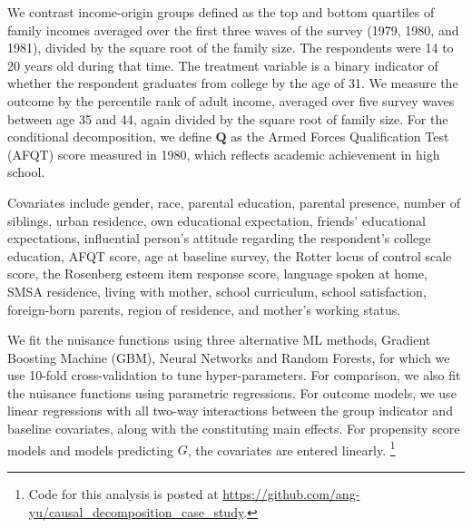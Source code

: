 \documentclass[12pt,a4paper]{article}
\def\Q{{\boldsymbol Q}}
\begin{document}
We contrast income-origin groups defined as the top and bottom quartiles of family incomes averaged over the first three waves of the survey (1979, 1980, and 1981), divided by the square root of the family size. The respondents were 14 to 20 years old during that time. The treatment variable is a binary indicator of whether the respondent graduates from college by the age of 31. We measure the outcome by the percentile rank of adult income, averaged over five survey waves between age 35 and 44, again divided by the square root of family size. For the conditional decomposition, we define $\Q$ as the Armed Forces Qualification Test (AFQT) score measured in 1980, which reflects academic achievement in high school. 

Covariates include gender, race, parental education, parental presence, number of siblings, urban residence, own educational expectation, friends' educational expectations, influential person's attitude regarding the respondent's college education, AFQT score, age at baseline survey, the Rotter locus of control scale score, the Rosenberg esteem item response score, language spoken at home, SMSA residence, living with mother, school curriculum, school satisfaction, foreign-born parents, region of residence, and mother's working status. 

We fit the nuisance functions using three alternative ML methods, Gradient Boosting Machine (GBM), Neural Networks and Random Forests, for which we use 10-fold cross-validation to tune hyper-parameters. For comparison, we also fit the nuisance functions using parametric regressions. For outcome models, we use linear regressions with all two-way interactions between the group indicator and baseline covariates, along with the constituting main effects. For propensity score models and models predicting $G$, the covariates are entered linearly. \footnote{Code for this analysis is posted at \url{https://github.com/ang-yu/causal_decomposition_case_study}.}
\end{document}

